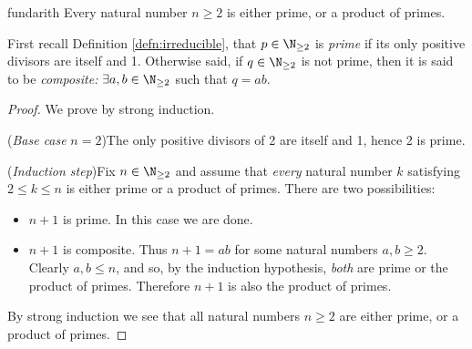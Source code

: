 \begin{thm}{}{fundarith}
	Every natural number $n\ge 2$ is either prime, or a product of primes.
\end{thm}

First recall Definition \ref{defn:irreducible}, that $p\in\N_{\ge 2}$ is \emph{prime} if its only positive divisors are itself and 1. Otherwise said, if $q\in\N_{\ge 2}$ is not prime, then it is said to be \emph{composite:} $\exists a,b\in\N_{\ge 2}$ such that $q=ab$.

\begin{proof}
	We prove by strong induction.\par
	(\emph{Base case} $n=2$)\quad The only positive divisors of 2 are itself and 1, hence 2 is prime.\par
	(\emph{Induction step})\quad Fix $n\in\N_{\ge 2}$ and assume that \emph{every} natural number $k$ satisfying $2\le k\le n$ is either prime or a product of primes. There are two possibilities:
	\begin{itemize}
	  \item $n+1$ is prime. In this case we are done.
	  \item $n+1$ is composite. Thus $n+1=ab$ for some natural numbers $a,b\ge 2$. Clearly $a,b\le n$, and so, by the induction hypothesis, \emph{both} are prime or the product of primes. Therefore $n+1$ is also the product of primes.
	\end{itemize}
	By strong induction we see that all natural numbers $n\ge 2$ are either prime, or a product of primes.
\end{proof}
% 
% 

